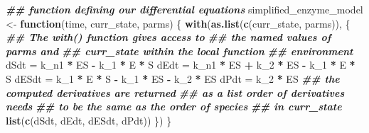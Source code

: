 \documentclass[
]{article}
\newenvironment{Shaded}{\begin{snugshade}}{\end{snugshade}}
\newcommand{\ControlFlowTok}[1]{\textcolor[rgb]{0.13,0.29,0.53}{\textbf{#1}}}
\newcommand{\DocumentationTok}[1]{\textcolor[rgb]{0.56,0.35,0.01}{\textbf{\textit{#1}}}}
\newcommand{\FunctionTok}[1]{\textcolor[rgb]{0.13,0.29,0.53}{\textbf{#1}}}
\newcommand{\NormalTok}[1]{#1}
\newcommand{\OtherTok}[1]{\textcolor[rgb]{0.56,0.35,0.01}{#1}}
\newcommand{\SpecialCharTok}[1]{\textcolor[rgb]{0.81,0.36,0.00}{\textbf{#1}}}
\begin{document}
\begin{Shaded}
\begin{Highlighting}[]
\DocumentationTok{\#\# function defining our differential equations}
\NormalTok{simplified\_enzyme\_model }\OtherTok{\textless{}{-}} \ControlFlowTok{function}\NormalTok{(time, curr\_state,}
\NormalTok{    parms) \{}
    \FunctionTok{with}\NormalTok{(}\FunctionTok{as.list}\NormalTok{(}\FunctionTok{c}\NormalTok{(curr\_state, parms)), \{}
        \DocumentationTok{\#\# The with() function gives access to}
        \DocumentationTok{\#\# the named values of parms and}
        \DocumentationTok{\#\# curr\_state within the local function}
        \DocumentationTok{\#\# environment}
\NormalTok{        dSdt }\OtherTok{=}\NormalTok{ k\_n1 }\SpecialCharTok{*}\NormalTok{ ES }\SpecialCharTok{{-}}\NormalTok{ k\_1 }\SpecialCharTok{*}\NormalTok{ E }\SpecialCharTok{*}\NormalTok{ S}
\NormalTok{        dEdt }\OtherTok{=}\NormalTok{ k\_n1 }\SpecialCharTok{*}\NormalTok{ ES }\SpecialCharTok{+}\NormalTok{ k\_2 }\SpecialCharTok{*}\NormalTok{ ES }\SpecialCharTok{{-}}\NormalTok{ k\_1 }\SpecialCharTok{*}\NormalTok{ E }\SpecialCharTok{*}\NormalTok{ S}
\NormalTok{        dESdt }\OtherTok{=}\NormalTok{ k\_1 }\SpecialCharTok{*}\NormalTok{ E }\SpecialCharTok{*}\NormalTok{ S }\SpecialCharTok{{-}}\NormalTok{ k\_1 }\SpecialCharTok{*}\NormalTok{ ES }\SpecialCharTok{{-}}\NormalTok{ k\_2 }\SpecialCharTok{*}\NormalTok{ ES}
\NormalTok{        dPdt }\OtherTok{=}\NormalTok{ k\_2 }\SpecialCharTok{*}\NormalTok{ ES}
        \DocumentationTok{\#\# the computed derivatives are returned}
        \DocumentationTok{\#\# as a list order of derivatives needs}
        \DocumentationTok{\#\# to be the same as the order of species}
        \DocumentationTok{\#\# in curr\_state}
        \FunctionTok{list}\NormalTok{(}\FunctionTok{c}\NormalTok{(dSdt, dEdt, dESdt, dPdt))}
\NormalTok{    \})}
\NormalTok{\}}
\end{Highlighting}
\end{Shaded}
\end{document}
